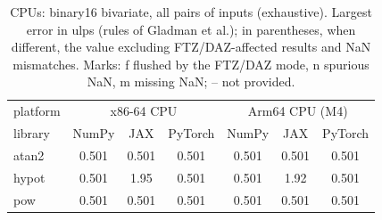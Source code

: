 \begin{table}
\centering
\begin{small}
\begin{tabular}{|l|ccc|ccc|}
\hline
platform & \multicolumn{3}{c|}{x86-64 CPU} & \multicolumn{3}{c|}{Arm64 CPU (M4)} \\
library & NumPy & JAX & PyTorch & NumPy & JAX & PyTorch \\ \hline
atan2 & 0.501 & 0.501 & 0.501 & 0.501 & 0.501 & 0.501 \\
hypot & 0.501 & 1.95 & 0.501 & 0.501 & 1.92 & 0.501 \\
pow & 0.501 & 0.501 & 0.501 & 0.501 & 0.501 & 0.501 \\
\hline
\end{tabular}
\end{small}
\caption{CPUs: binary16 bivariate, all pairs of inputs (exhaustive). Largest error in ulps (rules of Gladman et al.); in parentheses, when different, the value excluding FTZ/DAZ-affected results and NaN mismatches. Marks: f flushed by the FTZ/DAZ mode, n spurious NaN, m missing NaN; -- not provided.}
\label{tab:b16bicpu}
\end{table}
